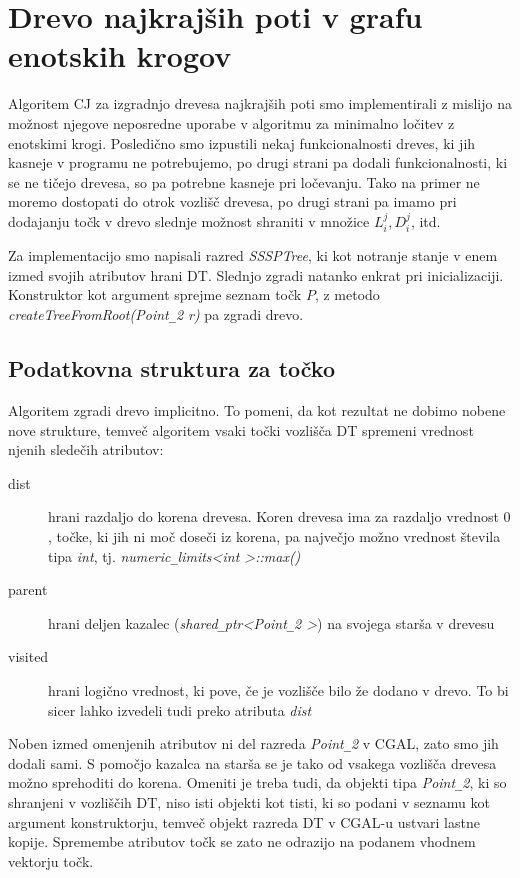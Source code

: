 \documentclass[a4paper, 12pt]{book}
\newcommand{\U}{\texttt{\_}}
\begin{document}
\section{Drevo najkrajših poti v grafu enotskih krogov}

Algoritem CJ za izgradnjo drevesa najkrajših poti smo implementirali z mislijo na možnost njegove neposredne uporabe v algoritmu za minimalno ločitev z enotskimi krogi. Posledično smo izpustili nekaj funkcionalnosti dreves, ki jih kasneje v programu ne potrebujemo, po drugi strani pa dodali funkcionalnosti, ki se ne tičejo drevesa, so pa potrebne kasneje pri ločevanju. Tako na primer ne moremo dostopati do otrok vozlišč drevesa, po drugi strani pa imamo pri dodajanju točk v drevo slednje možnost shraniti v množice $L_i^j, D_i^j$, itd.

Za implementacijo smo napisali razred \textit{SSSPTree}, ki kot notranje stanje v enem izmed svojih atributov hrani DT. Slednjo zgradi natanko enkrat pri inicializaciji. Konstruktor kot argument sprejme seznam točk $P$, z metodo \textit{createTreeFromRoot(Point\U 2 r)} pa zgradi drevo.

\subsection{Podatkovna struktura za točko}
\label{point-refs}
Algoritem zgradi drevo implicitno. To pomeni, da kot rezultat ne dobimo nobene nove strukture, temveč algoritem vsaki točki vozlišča DT spremeni vrednost njenih sledečih atributov:

\begin{description}
\item[dist] hrani razdaljo do korena drevesa. Koren drevesa ima za razdaljo vrednost $0$, točke, ki jih ni moč doseči iz korena, pa največjo možno vrednost števila tipa \textit{int}, tj. \textit{numeric\U limits\textless int \textgreater ::max()}
\item[parent] hrani deljen kazalec (\textit{shared\U ptr\textless Point\U 2 \textgreater}) na svojega starša v drevesu
\item[visited] hrani logično vrednost, ki pove, če je vozlišče bilo že dodano v drevo. To bi sicer lahko izvedeli tudi preko atributa \textit{dist}
\end{description}

Noben izmed omenjenih atributov ni del razreda \textit{Point\U 2} v CGAL, zato smo jih dodali sami. S pomočjo kazalca na starša se je tako od vsakega vozlišča drevesa možno sprehoditi do korena. Omeniti je treba tudi, da objekti tipa \textit{Point\U 2}, ki so shranjeni v vozliščih DT, niso isti objekti kot tisti, ki so podani v seznamu kot argument konstruktorju, temveč objekt razreda DT v CGAL-u ustvari lastne kopije. Spremembe atributov točk se zato ne odrazijo na podanem vhodnem vektorju točk. 
\end{document}
